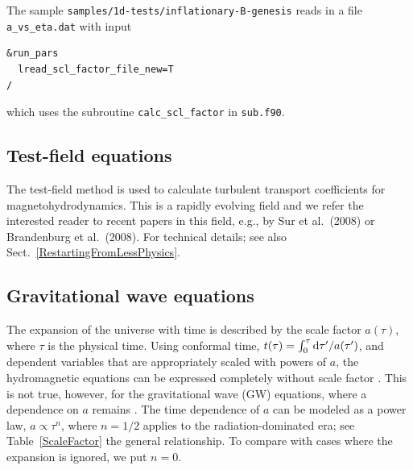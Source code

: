 \documentclass[\mydriver,12pt,twoside,notitlepage,a4paper]{article}
\newcommand{\code}[1]{\texttt{#1}}
\newcommand{\dd}{{\rm d} {}}
\def\half{\textstyle{\frac{1}{2}}}
\begin{document}
The sample \code{samples/1d-tests/inflationary-B-genesis} reads in a file
\code{a_vs_eta.dat} with input
\begin{verbatim}
&run_pars
  lread_scl_factor_file_new=T
/
\end{verbatim}
which uses the subroutine \code{calc_scl_factor} in \code{sub.f90}.


\subsection{Test-field equations}

The test-field method is used to calculate turbulent transport coefficients
for magnetohydrodynamics.
This is a rapidly evolving field and we refer the interested reader to
recent papers in this field, e.g., by Sur et al.\ (2008) or
Brandenburg et al.\ (2008).
For technical details; see also Sect.~\ref{RestartingFromLessPhysics}.


\subsection{Gravitational wave equations}

\def\SX{S_\times}
\def\ST{S_+}
\def\hX{h_\times}
\def\hT{h_+}
\def\hX{h_\times}
\def\thT{\tilde{h}_+}
\def\thX{\tilde{h}_\times}
\def\dhT{\dot{h}_+}
\def\dhX{\dot{h}_\times}
\def\dthT{\dot{\tilde{h}}_+}
\def\dthX{\dot{\tilde{h}}_\times}
\def\hrms{h_{\rm rms}}
\def\dhrms{\dot{h}_{\rm rms}}
\def\kGW{k_{\rm GW}}
\def\Sh{S_{h}}
\def\Ah{A_{h}}
\def\Shdot{S_{\dot{h}}}
\def\Ahdot{A_{\dot{h}}}
\def\EEGW{{\cal E}_{\rm GW}}
\def\EGW{E_{\rm GW}}
\def\HGW{H_{\rm GW}}
\def\Imag{\mbox{\rm Im}}
\def\DD{\rm D}
\def\ii{\rm i}
\newcommand{\SSSS}{\mbox{\boldmath ${\sf S}$} {}}
\def\onethird{{\textstyle{1\over3}}}
\def\half{{\textstyle{1\over2}}}

The expansion of the universe with time is described by the scale
factor $a(\tau)$, where $\tau$ is the physical time.
Using conformal time, $t(\tau)=\int_0^\tau\dd\tau'/a(\tau')$, and
dependent variables that are appropriately scaled with powers of $a$,
the hydromagnetic equations can be expressed completely without scale
factor \cite{BEO96,Dur08}.
This is not true, however, for the gravitational wave (GW) equations,
where a dependence on $a$ remains \cite{Dur08}.
The time dependence of $a$ can be modeled as a power law,
$a\propto\tau^n$, where $n=1/2$ applies to the radiation-dominated era;
see Table~\ref{ScaleFactor} the general relationship.
To compare with cases where the expansion is ignored, we put $n=0$.
\end{document}
